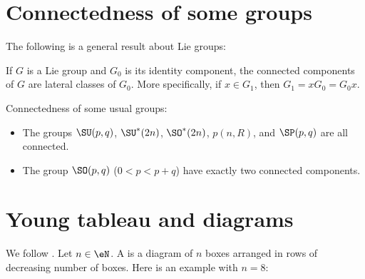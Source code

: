 
\section{Connectedness of some groups}

The following is a general result about Lie groups:
\begin{lemma} \label{LemConnSpecMo}
If $G$ is a Lie group and $G_0$ is its identity component, the connected components of $G$ are lateral classes of $G_0$. More specifically, if $x\in G_1$, then $G_1=xG_0=G_0x$.
\end{lemma}

\begin{lemma}   \label{LemOHjzfsL}
Connectedness of some usual groups:
\begin{itemize}
\item 
    The groups $\SU(p, q)$, $\SU^*(2n)$, $\SO^*(2n)$, $p(n, R)$, and $\SP(p, q)$ are
all connected.
\item 
    The group $\SO(p, q)$ ($0<p<p+q$) have exactly two connected components.
\end{itemize}
\end{lemma}

					\section{Young tableau and diagrams}

We follow \cite{ModavePoincarre}. Let $n\in \eN$. A  is a diagram of $n$ boxes arranged in rows of decreasing number of boxes. Here is an example with $n=8$:
%	

